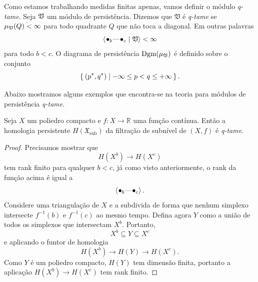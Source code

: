Como estamos trabalhando medidas finitas apenas, vamos definir o módulo \textit{q-tame}. Seja 
$\mathfrak{V}$ um módulo de persistência. Dizemos que $\mathfrak{V}$ é \textit{q-tame} se 
$\mu_{\mathfrak{V}}(Q) < \infty$ para todo quadrante $Q$ que não toca a diagonal. Em outras palavras
\begin{equation*}
    \innerproduct{\qon{b} \qem \qon{c} \mid \frakv} < \infty
\end{equation*}
para todo $b < c$. O diagrama de persistência $\text{Dgm}(\mu_{\mathfrak{V}})$ é definido sobre o conjunto
\begin{equation*}
    \Set{(p^*, q^*) | -\infty \leq p < q \leq + \infty}.
\end{equation*}

Abaixo mostramos alguns exemplos que encontra-se na teoria para módulos de persistência \textit{q-tame}.

\begin{teo}\label{teo:tameum}
Seja $X$ um poliedro compacto e $f \colon X \to \mathbb{R}$ uma função contínua. Então a homologia
persistente $H(\mathfrak{X}_{\text{sub}})$ da filtração de subnível de $(X,f)$ é \textit{q-tame}. 
\end{teo}
\begin{proof}
Precisamos mostrar que 
\begin{equation*}
    H(X^b) \to H(X^c) 
\end{equation*}
tem rank finito para qualquer $b < c$, já como visto anteriormente, o rank da função acima
é igual a
\begin{equation*}
    \innerproduct{\qon{b} \qem \qon{c}}.
\end{equation*}
Considere uma triangulação de $X$ e a subdivida de forma que 
nenhum simplexo intersecte $f^{-1}(b)$ e $f^{-1}(c)$ ao mesmo tempo. Defina agora $Y$ como a união
de todos os simplexos que intersectam $X^b$. Portanto, 
\begin{equation*}
    X^b \subseteq Y \subseteq X^c
\end{equation*} 
e aplicando o funtor de homologia
\begin{equation*}
    H(X^b) \longrightarrow H(Y) \longrightarrow H(X^c).
\end{equation*}
Como $Y$ é um poliedro compacto, $H(Y)$ tem dimensão finita, portanto a aplicação $H(X^b) \to H(X^c)$ 
tem rank finito. 
\end{proof}

